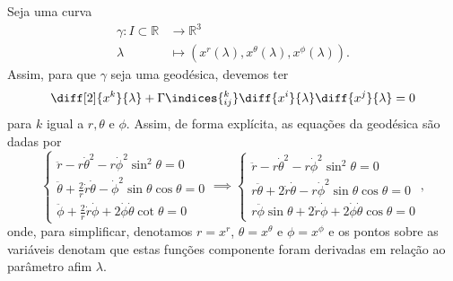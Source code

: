 Seja uma curva
\begin{align*}
    \gamma : I \subset \mathbb{R} &\to \mathbb{R}^3\\
                          \lambda &\mapsto \left(x^r(\lambda), x^\theta(\lambda), x^\phi(\lambda)\right).
\end{align*}
Assim, para que \(\gamma\) seja uma geodésica, devemos ter
\begin{equation*}
   \diff[2]{x^k}{\lambda} + \Gamma\indices{^k_{ij}}\diff{x^i}{\lambda}\diff{x^j}{\lambda} = 0
\end{equation*}
para \(k\) igual a \(r, \theta\) e \(\phi\). Assim, de forma explícita, as equações da geodésica são dadas por
\begin{equation*}
    \begin{cases}
        \ddot{r} - r\dot{\theta}^2 -r\dot{\phi}^2 \sin^2\theta = 0\\
        \ddot{\theta} + \frac2r \dot{r}\dot{\theta} - \dot{\phi}^2\sin\theta\cos\theta=0\\
        \ddot{\phi} + \frac2r \dot{r}\dot{\phi} + 2\dot\phi\dot\theta \cot\theta = 0
    \end{cases} \implies
    \begin{cases}
        \ddot{r} - r\dot{\theta}^2 -r\dot{\phi}^2 \sin^2\theta = 0\\
        r\ddot{\theta} + 2\dot{r}\dot{\theta} - r\dot{\phi}^2\sin\theta\cos\theta=0\\
        r\ddot{\phi}\sin\theta + 2\dot{r}\dot{\phi} + 2\dot\phi\dot\theta \cos\theta = 0
    \end{cases},
\end{equation*}
onde, para simplificar, denotamos \(r = x^r\), \(\theta = x^\theta\) e \(\phi = x^\phi\) e os pontos sobre as variáveis denotam que estas funções componente foram derivadas em relação ao parâmetro afim \(\lambda\).

